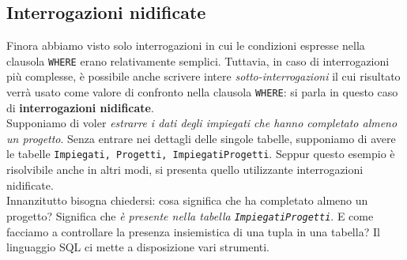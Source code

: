 \documentclass[12pt]{report}
\begin{document}
	\subsection{Interrogazioni nidificate}
	Finora abbiamo visto solo interrogazioni in cui le condizioni espresse nella clausola \texttt{WHERE} erano relativamente semplici. Tuttavia, in caso di interrogazioni più complesse, è possibile anche scrivere intere \textit{sotto-interrogazioni} il cui risultato verrà usato come valore di confronto nella clausola \texttt{WHERE}: si parla in questo caso di \textbf{interrogazioni nidificate}.\\
	Supponiamo di voler \textit{estrarre i dati degli impiegati che hanno completato almeno un progetto}. Senza entrare nei dettagli delle singole tabelle, supponiamo di avere le tabelle \texttt{Impiegati, Progetti, ImpiegatiProgetti}. Seppur questo esempio è risolvibile anche in altri modi, si presenta quello utilizzante interrogazioni nidificate.\\
	Innanzitutto bisogna chiedersi: cosa significa che ha completato almeno un progetto? Significa che \textit{è presente nella tabella \texttt{ImpiegatiProgetti}}. E come facciamo a controllare la presenza insiemistica di una tupla in una tabella? Il linguaggio SQL ci mette a disposizione vari strumenti.
	
\end{document}
